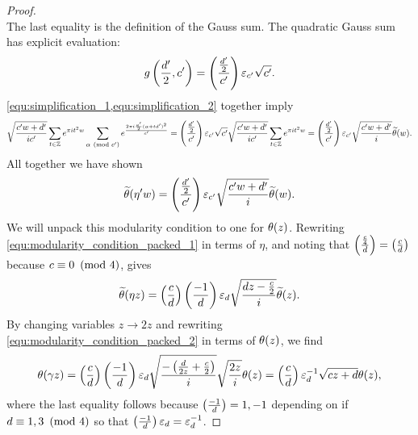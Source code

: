 \documentclass[12pt,reqno,oneside]{amsart}
\begin{document}
\begin{proof}
\begin{equation}
        \end{equation}
        The last equality is the definition of the Gauss sum. The quadratic Gauss sum has explicit evaluation:
        \begin{equation}\label{equ:simplification_2}
            g\left(\frac{d'}{2},c'\right) = \left(\frac{\frac{d'}{2}}{c'}\right)\varepsilon_{c'}\sqrt{c'}.
        \end{equation}
        \cref{equ:simplification_1,equ:simplification_2} together imply
        \[
            \sqrt{\frac{c'w+d'}{ic'}}\sum_{t \in \mathbb{Z}}e^{\pi it^{2}w}\sum_{\alpha \ \left(\text{mod }c'\right)}e^{\frac{2\pi i\frac{a'}{2}(\alpha+td')^{2}}{c'}} = \left(\frac{\frac{d'}{2}}{c'}\right)\varepsilon_{c'}\sqrt{c'}\sqrt{\frac{c'w+d'}{ic'}}\sum_{t \in \mathbb{Z}}e^{\pi it^{2}w} = \left(\frac{\frac{d'}{2}}{c'}\right)\varepsilon_{c'}\sqrt{\frac{c'w+d'}{i}}\widetilde{\theta}(w).
        \]
        All together we have shown
        \begin{equation}\label{equ:modularity_condition_packed_1}
            \widetilde{\theta}(\eta' w) = \left(\frac{\frac{d'}{2}}{c'}\right)\varepsilon_{c'}\sqrt{\frac{c'w+d'}{i}}\widetilde{\theta}(w).
        \end{equation}
        We will unpack this modularity condition to one for $\theta(z)$. Rewriting \cref{equ:modularity_condition_packed_1} in terms of $\eta$, and noting that $\textstyle{\left(\frac{\frac{c}{4}}{d}\right)} = \textstyle{\left(\frac{c}{d}\right)}$ because $c \equiv 0 \ \left(\text{mod }4\right)$, gives
        \begin{equation}\label{equ:modularity_condition_packed_2}
            \widetilde{\theta}(\eta z) = \left(\frac{c}{d}\right)\left(\frac{-1}{d}\right)\varepsilon_{d}\sqrt{\frac{dz-\frac{c}{2}}{i}}\widetilde{\theta}(z).
        \end{equation}
        By changing variables $z \to 2z$ and rewriting \cref{equ:modularity_condition_packed_2} in terms of $\theta(z)$, we find
        \[
            \theta(\gamma z) = \left(\frac{c}{d}\right)\left(\frac{-1}{d}\right)\varepsilon_{d}\sqrt{\frac{-\left(\frac{d}{2z}+\frac{c}{2}\right)}{i}}\sqrt{\frac{2z}{i}}\theta(z) = \left(\frac{c}{d}\right)\varepsilon_{d}^{-1}\sqrt{cz+d}\theta(z),
        \]
        where the last equality follows because $\left(\frac{-1}{d}\right) = 1,-1$ depending on if $d \equiv 1,3 \ \left(\text{mod }4\right)$ so that $\left(\frac{-1}{d}\right)\varepsilon_{d} = \varepsilon_{d}^{-1}$.
    \end{proof}
\end{document}
